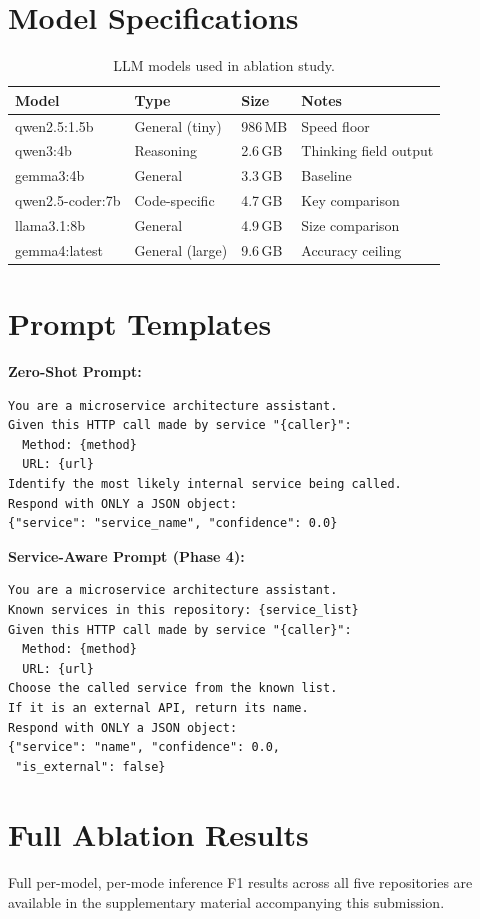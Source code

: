 \documentclass[runningheads]{llncs}
\begin{document}
\appendix

\section{Model Specifications}
\label{app:models}

\begin{table}[h]
\caption{LLM models used in ablation study.}
\centering
\small
\begin{tabular}{llll}
\toprule
Model & Type & Size & Notes \\
\midrule
qwen2.5:1.5b       & General (tiny)  & 986\,MB  & Speed floor \\
qwen3:4b           & Reasoning       & 2.6\,GB  & Thinking field output \\
gemma3:4b          & General         & 3.3\,GB  & Baseline \\
qwen2.5-coder:7b   & Code-specific   & 4.7\,GB  & Key comparison \\
llama3.1:8b        & General         & 4.9\,GB  & Size comparison \\
gemma4:latest      & General (large) & 9.6\,GB  & Accuracy ceiling \\
\bottomrule
\end{tabular}
\end{table}

\section{Prompt Templates}
\label{app:prompts}

\textbf{Zero-Shot Prompt:}
\begin{lstlisting}
You are a microservice architecture assistant.
Given this HTTP call made by service "{caller}":
  Method: {method}
  URL: {url}
Identify the most likely internal service being called.
Respond with ONLY a JSON object:
{"service": "service_name", "confidence": 0.0}
\end{lstlisting}

\textbf{Service-Aware Prompt (Phase 4):}
\begin{lstlisting}
You are a microservice architecture assistant.
Known services in this repository: {service_list}
Given this HTTP call made by service "{caller}":
  Method: {method}
  URL: {url}
Choose the called service from the known list.
If it is an external API, return its name.
Respond with ONLY a JSON object:
{"service": "name", "confidence": 0.0,
 "is_external": false}
\end{lstlisting}

\section{Full Ablation Results}
\label{app:ablation}

Full per-model, per-mode inference F1 results across all five repositories
are available in the supplementary material accompanying this submission.
\end{document}
